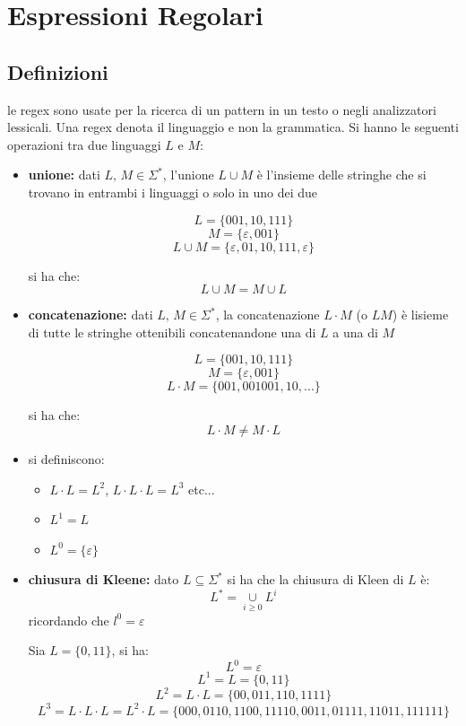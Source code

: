 \setchapterpreamble[u]{\margintoc}
\chapter{Espressioni Regolari}\label{cha:espressioni-regolari}


\section{Definizioni}
le regex sono usate per la ricerca di un pattern in un testo o negli analizzatori lessicali. Una regex denota il linguaggio e non la grammatica. Si hanno le seguenti operazioni tra due linguaggi $L$ e $M$:
\begin{itemize}
	\item \textbf{unione:} dati $L,\, M\in \Sigma^*$, l'unione $L\cup M$ è l'insieme delle stringhe che si trovano in entrambi i linguaggi o solo in uno dei due
				\begin{example}
					$$L=\{001,10,111\}$$
					$$M=\{\varepsilon,001\}$$
					$$L\cup M=\{\varepsilon,01,10,111,\varepsilon\}$$
				\end{example}
				si ha che:
				$$L\cup M=M\cup L$$
	\item \textbf{concatenazione:} dati $L,\, M\in \Sigma^*$, la concatenazione $L\cdot M$ (o $LM$) è lisieme di tutte le stringhe ottenibili concatenandone una di $L$ a una di $M$
				\begin{example}
					$$L=\{001,10,111\}$$
					$$M=\{\varepsilon,001\}$$
					$$L\cdot M=\{001,001001,10,...\}$$
				\end{example}
				si ha che:
				$$L\cdot M\neq M\cdot L$$
	\item si definiscono:
				\begin{itemize}
					\item $L\cdot L=L^2$, $L\cdot L\cdot L=L^3$ etc...
					\item $L^1=L$
					\item $L^0=\{\varepsilon\}$
				\end{itemize}
	\item \textbf{chiusura di Kleene:} dato $L\subseteq \Sigma^*$ si ha che la chiusura di Kleen di $L$ è:
				$$L^*=\underset{i\geq 0}{\cup}L^i$$
				ricordando che $l^0=\varepsilon$
				\begin{example}
					Sia $L=\{0,11\}$, si ha:
					$$L^0=\varepsilon$$
					$$L^1=L=\{0,11\}$$
					$$L^2=L\cdot L=\{00,011,110,1111\}$$
					$$L^3=L\cdot L\cdot L=L^2\cdot L=\{000,0110,1100,11110,0011,01111,11011,111111\}$$

\end{example}
\end{itemize}
